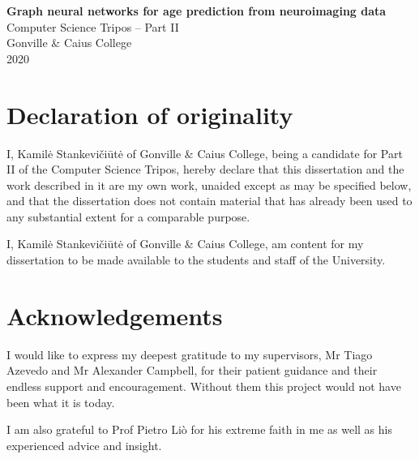 \pagestyle{empty}
\thispagestyle{empty}


\vspace*{60mm}
\begin{center}
\Large
\textbf{Graph neural networks for age prediction from neuroimaging data} \\[5mm]
\large
Computer Science Tripos -- Part II \\[5mm]
Gonville \& Caius College \\[5mm]
2020
\end{center}


\pagestyle{plain}
\newpage
\section*{Declaration of originality}

I, Kamilė Stankevičiūtė of Gonville \& Caius College, being a candidate for Part II of the Computer Science Tripos, hereby declare that this dissertation and the work described in it are my own work, unaided except as may be specified below, and that the dissertation does not contain material that has already been used to any substantial extent for a comparable purpose.

I, Kamilė Stankevičiūtė of Gonville \& Caius College, am content for my dissertation to be made available to the students and staff of the University.

\bigskip
{}

\medskip
{}

\section*{Acknowledgements}

I would like to express my deepest gratitude to my supervisors, Mr Tiago Azevedo and Mr Alexander Campbell, for their patient guidance and their endless support and encouragement. Without them this project would not have been what it is today.

I am also grateful to Prof Pietro Liò for his extreme faith in me as well as his experienced advice and insight.

